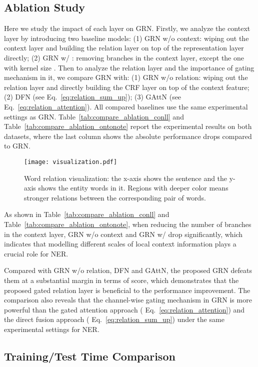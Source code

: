 \documentclass[letterpaper]{article} \usepackage{aaai19}  \usepackage{times}  \usepackage{helvet}  \usepackage{courier}  \usepackage{url}  \usepackage{graphicx}  \usepackage{amsmath}
\newcommand{\ie}{\text{i.e.,}}
\newcommand{\GAN}{GAttN}
\newcommand{\GRN}{GRN}
\begin{document}
\subsection{Ablation Study}
Here we study the impact of each layer on \GRN{}. Firstly, we analyze the context layer by introducing two baseline models: (1) \GRN{} w/o context: wiping out the context layer and building the relation layer on top of the representation layer directly; (2) \GRN{} w/ : removing branches in the context layer, except the one with kernel size . Then to analyze the relation layer and the importance of gating mechanism in it, we compare \GRN{} with: (1) \GRN{} w/o relation: wiping out the relation layer and directly building the CRF layer on top of the context feature; (2) DFN (see Eq.~\ref{eq:relation_sum_up}); (3) \GAN{} (see Eq.~\ref{eq:relation_attention}). All compared baselines use the same experimental settings as \GRN{}. Table~\ref{tab:compare_ablation_conll} and Table~\ref{tab:compare_ablation_ontonote} report the experimental results on both datasets, where the last column shows the absolute performance drops compared to \GRN{}.

\begin{figure}[!t]\centering
  \texttt{[image: visualization.pdf]}
  \caption{Word relation visualization: the x-axis shows the sentence and the y-axis shows the entity words in it. Regions with deeper color means stronger relations between the corresponding pair of words.}
  \label{fig:visualization}
\end{figure}

As shown in Table~\ref{tab:compare_ablation_conll} and Table~\ref{tab:compare_ablation_ontonote}, when reducing the number of branches in the context layer, \GRN{} w/o context and \GRN{} w/  drop significantly, which indicates that modelling different scales of local context information plays a crucial role for NER.

Compared with \GRN{} w/o relation, DFN and \GAN{}, the proposed \GRN{} defeats them at a substantial margin in terms of  score, which demonstrates that the proposed gated relation layer is beneficial to the performance improvement. The comparison also reveals that the channel-wise gating mechanism in \GRN{} is more powerful than the gated attention approach (\ie{} Eq.~\ref{eq:relation_attention}) and the direct fusion approach (\ie{} Eq.~\ref{eq:relation_sum_up}) under the same experimental settings for NER.


\subsection{Training/Test Time Comparison}
\end{document}
